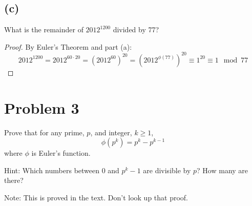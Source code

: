 \documentclass[14pt]{extarticle}
\begin{document}
\subsection{(c)}
What is the remainder of $2012^{1200}$ divided by 77?
\begin{proof}
By Euler's Theorem and part (a):
$$
2012^{1200} = 2012^{60 \cdot 20} = (2012^{60})^{20} = (2012^{\phi(77)})^{20} \equiv 1^{20} \equiv 1 \mod 77
$$
\end{proof}

\section{Problem 3}
Prove that for any prime, $p$, and integer, $k \geq 1$,
$$
\phi(p^k) = p^k - p^{k - 1}
$$
where $\phi$ is Euler’s function. 

Hint: Which numbers between 0 and $p^k - 1$ are divisible by $p$? How many are there?

Note: This is proved in the text. Don’t look up that proof.
\end{document}
